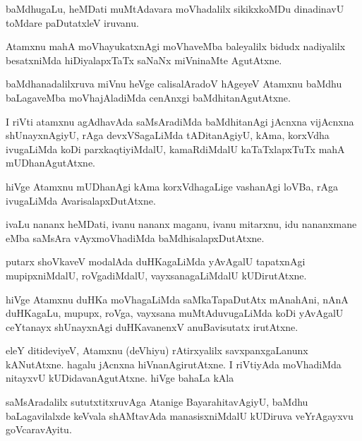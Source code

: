 \documentclass{article}
\begin{document}
\begin{mn}
baMdhugaLu, heMDati muMtAdavara moVhadalilx sikikxkoMDu dinadinavU toMdare
paDutatxleV iruvanu.
\end{mn}

\begin{mn}
Atamxnu mahA moVhayukatxnAgi moVhaveMba baleyalilx bidudx nadiyalilx besatxniMda
 hiDiyalapxTaTx saNaNx miVninaMte AgutAtxne.
\end{mn}

\begin{mn}
baMdhanadalilxruva miVnu heVge calisalAradoV hAgeyeV Atamxnu baMdhu baLagaveMba
moVhajAladiMda cenAnxgi baMdhitanAgutAtxne.
\end{mn}

\begin{mn}
I riVti atamxnu agAdhavAda saMsAradiMda baMdhitanAgi jAcnxna vijAcnxna 
shUnayxnAgiyU, rAga devxVSagaLiMda tADitanAgiyU, kAma, korxVdha ivugaLiMda 
koDi parxkaqtiyiMdalU, kamaRdiMdalU kaTaTxlapxTuTx mahA mUDhanAgutAtxne.
\end{mn}

\begin{mn}
hiVge Atamxnu mUDhanAgi kAma korxVdhagaLige vashanAgi loVBa, rAga ivugaLiMda
AvarisalapxDutAtxne.
\end{mn}

\begin{mn}
ivaLu nananx heMDati, ivanu nananx maganu, ivanu mitarxnu, idu nananxmane 
eMba saMsAra vAyxmoVhadiMda baMdhisalapxDutAtxne. 
\end{mn}

\begin{mn}
putarx shoVkaveV modalAda duHKagaLiMda yAvAgalU tapatxnAgi mupipxniMdalU,
 roVgadiMdalU, vayxsanagaLiMdalU kUDirutAtxne. 
\end{mn}

\begin{mn}
hiVge Atamxnu duHKa moVhagaLiMda saMkaTapaDutAtx mAnahAni, nAnA duHKagaLu,
 mupupx, roVga, vayxsana muMtAduvugaLiMda koDi yAvAgalU ceYtanayx shUnayxnAgi
 duHKavanenxV anuBavisutatx irutAtxne.
\end{mn}

\begin{mn}
eleY ditideviyeV, Atamxnu (deVhiyu) rAtirxyalilx savxpanxgaLanunx kANutAtxne.
 hagalu jAcnxna hiVnanAgirutAtxne.  I riVtiyAda moVhadiMda nitayxvU 
 kUDidavanAgutAtxne. hiVge bahaLa kAla
\end{mn}

\begin{mn}
saMsAradalilx  sututxtitxruvAga Atanige BayarahitavAgiyU, baMdhu baLagavilalxde
 keVvala shAMtavAda manasisxniMdalU kUDiruva veYrAgayxvu goVcaravAyitu.
\end{mn}
\end{document}
